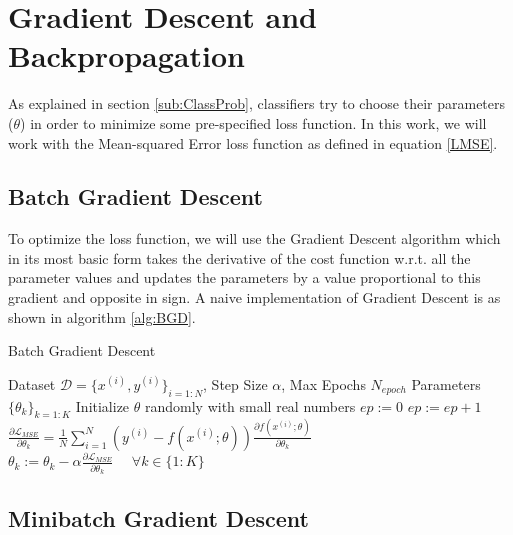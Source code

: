 \section{Gradient Descent and Backpropagation}
\label{GD}

As explained in section \ref{sub:ClassProb}, classifiers try to choose their parameters ($\theta$) in order to minimize some pre-specified loss function.
In this work, we will work with the Mean-squared Error loss function as defined in equation \ref{LMSE}.

\subsection{Batch Gradient Descent}
\label{sub:BGD}

To optimize the loss function, we will use the Gradient Descent algorithm which in its most basic form takes the derivative of the cost function w.r.t. all the parameter values and updates the parameters by a value proportional to this gradient and opposite in sign.
A naive implementation of Gradient Descent is as shown in algorithm \ref{alg:BGD}.
\begin{algorithm}[tb]
   \caption{Batch Gradient Descent}
   \label{alg:BGD}
\begin{algorithmic}
    Dataset $\mathcal{D} = \{x^{(i)},y^{(i)}\}_{i=1:N}$, Step Size $\alpha$, Max Epochs $N_{epoch}$
    Parameters $\{\theta_k\}_{k=1:K}$
   \STATE
   \STATE Initialize $\theta$ randomly with small real numbers
   \STATE $ep := 0$
   \REPEAT
   \STATE $ep := ep + 1$
   \STATE $\frac{\partial \mathcal{L}_{MSE}}{\partial \theta_k} = \frac{1}{N} \sum_{i=1}^N ( y^{(i)} - f(x^{(i)}; \theta)) \frac{\partial f(x^{(i)}; \theta)}{\partial \theta_k}$
   \ENDFOR
   \STATE $\theta_k := \theta_k - \alpha \frac{\partial \mathcal{L}_{MSE}}{\partial \theta_k} \hspace{16pt} \forall k \in \{1:K\}$
\end{algorithmic}
\end{algorithm}

\subsection{Minibatch Gradient Descent}
\label{sub:MGD}

